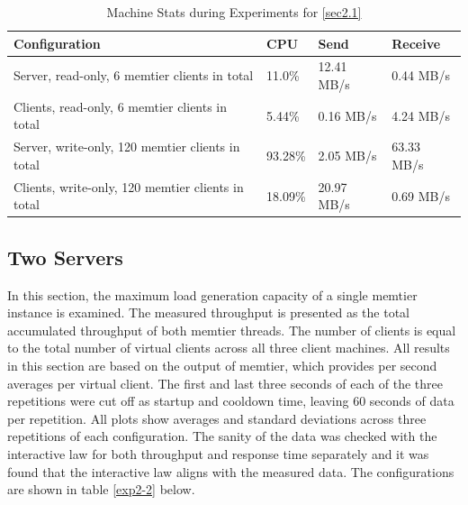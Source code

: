 \documentclass[11pt,a4paper]{article}
\begin{document}
\begin{center}
    \begin{table}
    	\begin{tabular}{|l|p{2cm}|p{2cm}|p{2cm}|}
            \hline \textbf{Configuration} & \textbf{CPU} & \textbf{Send} & \textbf{Receive}\\
            \hline Server, read-only, 6 memtier clients in total & 11.0\%         & 12.41 MB/s    & 0.44 MB/s\\
            \hline Clients, read-only, 6 memtier clients in total & 5.44\%           & 0.16 MB/s     & 4.24 MB/s\\
            \hline Server, write-only,  120 memtier clients in total & 93.28\%        & 2.05 MB/s     & 63.33 MB/s\\
            \hline Clients, write-only, 120 memtier clients in total & 18.09\%       & 20.97 MB/s     & 0.69 MB/s\\
            \hline
    	\end{tabular}
	\caption{Machine Stats during Experiments for \autoref{sec2.1}}
    \label{dstat:2-1}
	\end{table}
\end{center}

\subsection{Two Servers} \label{sec2.2}
In this section, the maximum load generation capacity of a single memtier instance is examined. The measured throughput is presented as the total accumulated throughput of both memtier threads. The number of clients is equal to the total number of virtual clients across all three client machines. All results in this section are based on the output of memtier, which provides per second averages per virtual client. The first and last three seconds of each of the three repetitions were cut off as startup and cooldown time, leaving 60 seconds of data per repetition. All plots show averages and standard deviations across three repetitions of each configuration. The sanity of the data was checked with the interactive law for both throughput and response time separately and it was found that the interactive law aligns with the measured data. The configurations are shown in table \autoref{exp2-2} below.
\end{document}
